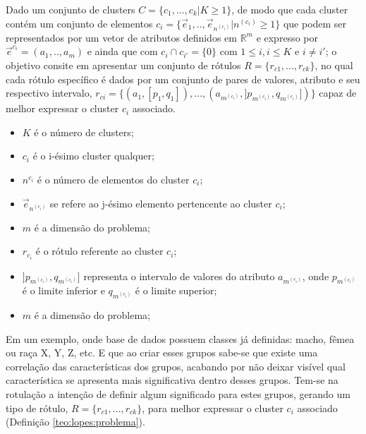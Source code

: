     \begin{teorema}
    Dado um conjunto de clusters ${C=\{c_1,...,c_k | K \geqslant 1\} }$, de modo que cada cluster contém um conjunto de elementos ${c_i=\{\vec{e}_1,..,\vec{e}_{n^{(c_i)}}|n^{(c_i)} \geqslant 1 \}}$ que podem ser representados por um vetor de atributos definidos em ${\mathbb{R}^m }$ e expresso por ${ \vec{e}^{c_i}=(a_1,..,a_m)  }$ e ainda que  com ${ c_i \cap c_{i'}=\{0\} }$ com ${ 1 \leqslant i, i \leqslant K  }$ e ${ i \neq i' }$; o objetivo consite em apresentar um conjunto de rótulos ${ R=\{ r_{c1},...,r_{ck} \} }$, no qual cada rótulo específico é dados por um conjunto de pares de valores, atributo e seu respectivo intervalo, ${ r_{ci}=\{ (a_1,[p_1,q_1]),...,(a_{m^{(c_i)}}, ]p_{m^{(c_i)}},q_{m^{(c_i)}}]) \} }$ capaz de melhor expressar o cluster ${c_i}$ associado.
        \begin{itemize}[noitemsep]
            \item ${K}$ é o número de clusters;
            \item ${c_i}$ é o i-ésimo cluster qualquer;
            \item ${n^{c_i}}$ é o número de elementos do cluster ${c_i}$;
            \item ${\vec{e}_{n^{(c_i)}}}$ se refere ao j-ésimo elemento pertencente ao cluster ${c_i}$;
            \item ${m}$ é a dimensão do problema;
            \item ${r_{c_i}}$ é o rótulo referente ao cluster ${c_i}$;
            \item ${]p_{m^{(c_i)}},q_{m^{(c_i)}}]}$ representa o intervalo de valores do atributo ${a_{m^{(c_i)}} }$, onde ${ p_{m^{(c_i)}} }$  é o limite inferior e ${ q_{m^{(c_i)}} }$ é o limite superior;
            \item ${m}$ é a dimensão do problema;
        \end{itemize}
    \label{teo:lopes:problema}
    \end{teorema}

Em um exemplo, onde base de dados possuem classes já definidas: macho, fêmea ou raça X, Y, Z, etc. E que ao criar esses grupos sabe-se que existe uma correlação das características dos grupos, acabando por não deixar visível qual característica se apresenta mais significativa dentro desses grupos. Tem-se na rotulação a intenção de definir algum significado para estes grupos, gerando um tipo de rótulo, ${ R=\{ r_{c1},...,r_{ck} \} }$, para melhor expressar o cluster ${c_i}$ associado (Definição \ref{teo:lopes:problema}).

